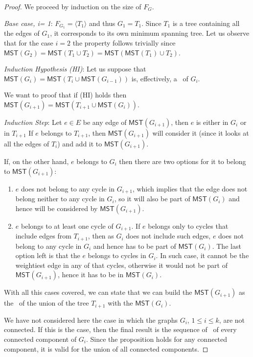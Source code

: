 \begin{proof}
    We proceed by induction on the size of  $F_G$.

    \emph{Base case, i= 1}: $F_{G_1} = \langle T_1\rangle$ and thus $G_1 = T_1$. Since $T_1$ is a tree containing all the edges of $G_1$, 
    it corresponds to its own minimum spanning tree.
    Let us observe that for the case $i=2$ the property follows trivially since $\mathsf{MST}(G_2) = \mathsf{MST}(T_1\cup T_2) = \mathsf{MST}(\mathsf{MST}(T_1)\cup T_2)$.

    \emph{Induction Hypothesis (HI)}: Let us suppose that $\mathsf{MST}(G_{i})=\mathsf{MST}(T_{i} \cup \mathsf{MST}(G_{i-1}))$ is,  
    effectively, a \mst\ of $G_i$.

    We want to proof that if (HI) holds then $\mathsf{MST}(G_{i+1})=\mathsf{MST}(T_{i+1} \cup \mathsf{MST}(G_{i}))$.
    
    \emph{Induction Step}:
    Let $e\in E$ be any edge of $\mathsf{MST}(G_{i+1})$, then $e$ is either in $G_i$ or in $T_{i+1}$ 
    If $e$ belongs to $T_{i+1}$, then $\mathsf{MST}(G_{i+1})$ will consider it (since it looks at all the edges of $T_i$) and add it to $\mathsf{MST}(G_{i+1})$.

    If, on the other hand, $e$ belongs to $G_i$ then there are two options for it to belong to $\mathsf{MST}(G_{i+1})$:
    \begin{enumerate}[1)]
        \item $e$ does not belong to any cycle in $G_{i+1}$, which implies that the edge does not belong neither to any cycle in $G_i$, 
        so it will also be part of $\mathsf{MST}(G_i)$ and hence will be considered by $\mathsf{MST}(G_{i+1})$.
        \item $e$ belongs to at least one cycle of $G_{i+1}$. If $e$ belongs only to cycles that include  
        edges from $T_{i+1}$, then as $G_i$ does not include such edges, $e$ does not belong to any cycle in $G_i$ and hence has to be part of $\mathsf{MST}(G_i)$. 
        The last option left is that the $e$ belongs to cycles in $G_i$. In such case, it cannot be the weightiest edge in any of that cycles, otherwise it would not be part of $\mathsf{MST}(G_{i+1})$, hence it has to be in $\mathsf{MST}(G_i)$.
    \end{enumerate}
    With all this cases covered, we can state that we can build the $\mathsf{MST}(G_{i+1})$ as the \mst\ of the union of the tree $T_{i+1}$ with the $\mathsf{MST}(G_i)$.

    We have not considered here the case in which the graphs $G_i$, $1\leq i\leq k$, are not connected. 
    If this is the case, then the final result is the sequence of \msts\ of every connected component of $G_i$. 
    Since the proposition holds for any connected component, it is valid for the union of all connected components. 
\end{proof}

